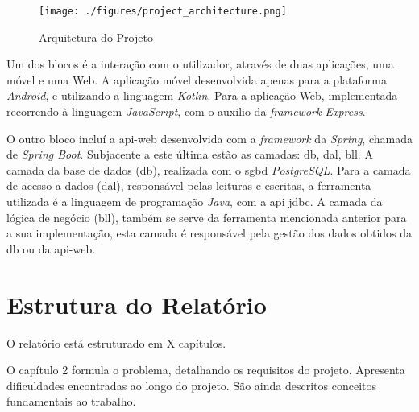 \begin{figure}[H]
	\centering
	\texttt{[image: ./figures/project\_architecture.png]}
	\caption{Arquitetura do Projeto}
	\label{project-architecture}
\end{figure}

Um dos blocos é a interação com o utilizador, através de duas aplicações, uma móvel e uma Web. A aplicação móvel desenvolvida apenas para a plataforma \textit{Android}, e utilizando a linguagem \textit{Kotlin}. Para a aplicação Web, implementada recorrendo à linguagem \textit{JavaScript}, com o auxilio da \textit{framework Express}. 

O outro bloco incluí a \gls{api-web} desenvolvida com a \textit{framework} da \textit{Spring}, chamada de \textit{Spring Boot}. Subjacente a este última estão as camadas: \acrfull{db}, \acrfull{dal}, \acrfull{bll}.  A camada da base de dados (\acrshort{db}), realizada com o \acrfull{sgbd} \textit{PostgreSQL}. Para a camada de acesso a dados (\acrshort{dal}), responsável pelas leituras e escritas, a ferramenta utilizada é a linguagem de programação \textit{Java}, com a \gls{api} \acrfull{jdbc}. A camada da lógica de negócio (\acrshort{bll}), também se serve da ferramenta mencionada anterior para a sua implementação, esta camada é responsável pela gestão dos dados obtidos da \acrshort{db} ou da \gls{api-web}.


%
%
\section{Estrutura do Relatório} \label{sec14}
O relatório está estruturado em X capítulos.

O capítulo 2 formula o problema, detalhando os requisitos do projeto. Apresenta dificuldades encontradas ao longo do projeto. São ainda descritos conceitos fundamentais ao trabalho.
